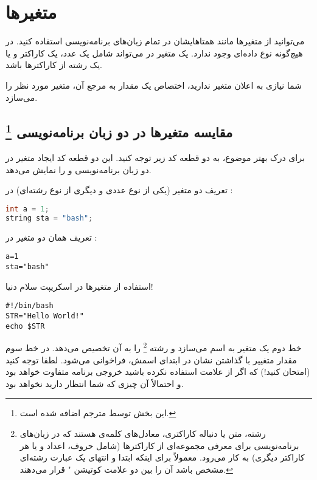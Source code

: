 \chapter{متغیر‌ها}
می‌توانید از متغیر‌ها مانند همتاهایشان در تمام زبان‌های برنامه‌نویسی استفاده کنید‌.
در  هیچ‌گونه نوع داده‌ای وجود ندارد‌. یک متغیر در  می‌تواند شامل یک عدد‌،
یک کاراکتر‌ و یا یک رشته از کاراکتر‌ها باشد.

شما نیازی به اعلان متغیر‌ ندارید‌، اختصاص یک مقدار به مرجع آن، متغیر مورد نظر را
می‌سازد.

\section*
{مقایسه متغیرها در دو زبان برنامه‌نویسی
\footnote{این بخش توسط مترجم اضافه شده است.}
}
برای درک بهتر موضوع، به دو قطعه کد زیر توجه کنید. این دو قطعه کد ایجاد متغیر در
دو زبان برنامه‌نویسی
  و
    را نمایش می‌دهد.

تعریف دو متغیر (یکی از نوع عددی و دیگری از نوع رشته‌ای) در ‎:

\begin{latin}
\begin{lstlisting}[language=C++]
int a = 1;
string sta = "bash";
\end{lstlisting}
\end{latin}

تعریف همان دو متغیر در :

\begin{latin}
\begin{lstlisting}
a=1
sta="bash"
\end{lstlisting}
\end{latin}

\begin{example}{استفاده از متغیرها در اسکریپت سلام دنیا!}
\begin{latin}
\begin{lstlisting}
#!/bin/bash
STR="Hello World!"
echo $STR
\end{lstlisting}
\end{latin}

خط دوم یک متغیر به اسم  می‌سازد و رشته
\footnote{
رشته، متن یا دنباله کاراکتری، معادل‌های کلمه‌ی  هستند که در زبان‌های برنامه‌نویسی
برای معرفی مجموعه‌ای از کاراکترها (شامل حروف، اعداد و یا هر کاراکتر دیگری) به کار
می‌رود. معمولاً برای اینکه ابتدا و انتهای یک عبارت رشته‌ای مشخص باشد آن را بین دو
علامت کوتیشن " قرار می‌دهند.

}
 را به آن تخصیص می‌دهد.
در خط سوم مقدار متغییر با گذاشتن نشان \code{\textdollar} در ابتدای اسمش، فراخوانی می‌شود. لطفا توجه
کنید (امتحان کنید!) که اگر از علامت \code{\textdollar} استفاده نکرده باشید خروجی برنامه متفاوت خواهد
بود و احتمالاً آن چیزی که شما انتظار دارید نخواهد بود.
\end{example}

